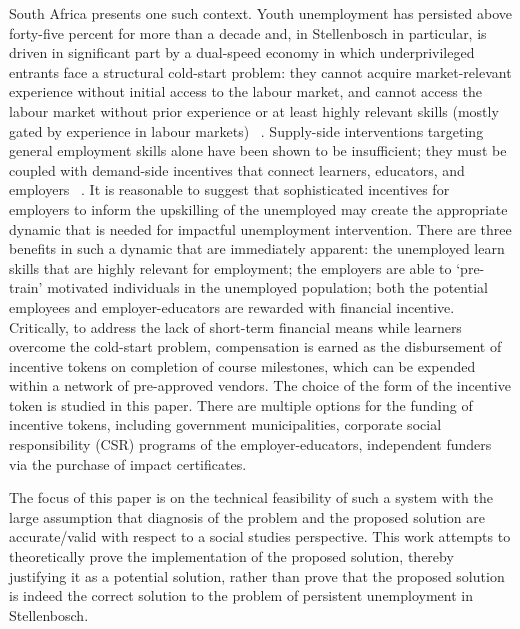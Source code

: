 \documentclass[conference]{IEEEtran}
\begin{document}
South Africa presents one such context. Youth unemployment has persisted above forty-five percent for more than a decade and, in Stellenbosch in particular, is driven in significant part by a dual-speed economy in which underprivileged entrants face a structural cold-start problem: they cannot acquire market-relevant experience without initial access to the labour market, and cannot access the labour market without prior experience or at least highly relevant skills (mostly gated by experience in labour markets) ~\cite{graham2015youth}.
Supply-side interventions targeting general employment skills alone have been shown to be insufficient; they must be coupled with demand-side incentives that connect learners, educators, and employers ~\cite{mckenzie2017almp}. It is reasonable to suggest that sophisticated incentives for employers to inform the upskilling of the unemployed may create the appropriate dynamic that is needed for impactful unemployment intervention. There are three benefits in such a dynamic that are immediately apparent: the unemployed learn skills that are highly relevant for employment; the employers are able to `pre-train' motivated individuals in the unemployed population; both the potential employees and employer-educators are rewarded with financial incentive. Critically, to address the lack of short-term financial means while learners overcome the cold-start problem, compensation is earned as the disbursement of incentive tokens on completion of course milestones, which can be expended within a network of pre-approved vendors. The choice of the form of the incentive token is studied in this paper. There are multiple options for the funding of incentive tokens, including government municipalities,  corporate social responsibility (CSR) programs of the employer-educators, independent funders via the purchase of impact certificates.

The focus of this paper is on the technical feasibility of such a system with the large assumption that diagnosis of the problem and the proposed solution are accurate/valid with respect to a social studies perspective. This work attempts to theoretically prove the implementation of the proposed solution, thereby justifying it as a potential solution, rather than prove that the proposed solution is indeed the correct solution to the problem of persistent unemployment in Stellenbosch.
\end{document}
